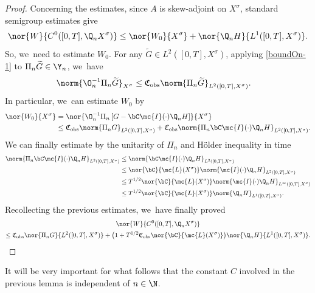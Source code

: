 \begin{proof}
Concerning the estimates, since $A$ is skew-adjoint on $X^{\sigma}$, standard semigroup estimates give\vspace*{-3pt}
\begin{align}
\nor{W}{C^{0}([0,T],\Q_{n}X^{\sigma})}\leq \nor{W_{0}}{X^{\sigma}}+\nor{\Q_{n} H}{L^{1}([0,T],X^{\sigma})}.
\end{align}
So, we~need to estimate $W_{0}$. For any $\widetilde{G}\in L^2([0, T], X^\sigma)$, applying \eqref{boundOn-1} to $\Pi_n \widetilde{G}\in \Y_n$, we~have\vspace*{-3pt}
\begin{align*}
\norm{\O_n^{-1}\Pi_n \widetilde{G}}_{X^\sigma}&\leq \mathfrak{C}_{\textup{obs}}\norm{\Pi_n\widetilde{G}}_{L^2([0, T], X^\sigma)}.
\end{align*}
In particular, we~can estimate $W_{0}$ by\vspace*{-3pt}
\begin{align*}
\nor{W_{0}}{X^{\sigma}}&= \nor{\O_n^{-1}\Pi_n\left[G-\bC\mc{I}(\cdot)\Q_n H\right]}{X^{\sigma}}\\ &\leq \mathfrak{C}_{\textup{obs}}\norm{\Pi_nG}_{L^2([0, T], X^\sigma)}+\mathfrak{C}_{\textup{obs}}\norm{\Pi_n\bC\mc{I}(\cdot)\Q_n H}_{L^2([0, T], X^\sigma)}.
\end{align*}
We can finally estimate by the unitarity of $\Pi_{n}$ and Hölder inequality in time\vspace*{-3pt}
\begin{align*}
\norm{\Pi_n\bC\mc{I}(\cdot)\Q_n H}_{L^2([0, T], X^\sigma)}&\leq \norm{\bC\mc{I}(\cdot)\Q_n H}_{L^2([0, T], X^\sigma)}\\ &\leq \nor{\bC}{\mc{L}(X^\sigma)}\norm{\mc{I}(\cdot)\Q_n H}_{L^2([0, T], X^\sigma)}\\
&\leq T^{1/2}\nor{\bC}{\mc{L}(X^\sigma)}\norm{\mc{I}(\cdot)\Q_n H}_{L^{\infty}([0, T], X^\sigma)}\\ &\leq T^{1/2}\nor{\bC}{\mc{L}(X^\sigma)}\norm{\Q_n H}_{L^{1}([0, T], X^\sigma)}.
\end{align*}
Recollecting the previous estimates, we~have finally proved\vspace*{-8pt}
\begin{multline*}
\nor{W}{C^{0}([0,T],\Q_{n}X^{\sigma})}\\\leq \mathfrak{C}_{\textup{obs}} \nor{\Pi_{n}G}{L^{2}([0,T],X^{\sigma})}+\bigl(1+T^{1/2}\mathfrak{C}_{\textup{obs}}\nor{\bC}{\mc{L}(X^\sigma)}\bigr)\nor{\Q_{n} H}{L^{1}([0,T],X^{\sigma})}.\qedhere
\end{multline*}
\end{proof}
\begin{remark}
It will be very important for what follows that the constant $C$ involved in the previous lemma is independent of $n\in\N$.
\end{remark}

